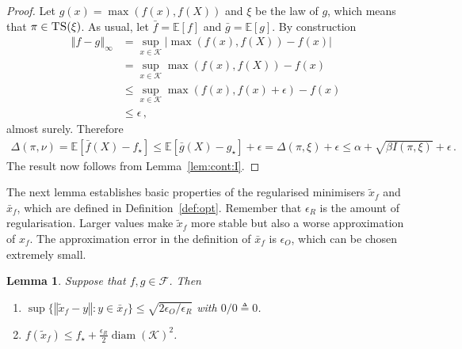 \documentclass[letter, 12pt]{report}
\newcommand{\epsR}{{\epsilon_R}}
\newcommand{\epsO}{{\epsilon_O}}
\newcommand{\norm}[1]{\left \Vert  #1 \right \Vert}
\newcommand{\E}{\mathbb E}
\newcommand{\cK}{\mathcal K}
\newcommand{\sF}{\mathscr F}
\newcommand{\diam}{\operatorname{diam}}
\newcommand{\1}{\mathbf{1}}
\newcommand{\ts}{\textsc{TS}\xspace}
\theoremstyle{plain}
\newtheorem{lemma}[theorem]{Lemma}
\theoremstyle{definition}
\theoremstyle{remark}
\begin{document}
\begin{proof}
    Let $g(x) = \max(f(x), f(X))$ and $\xi$ be the law of $g$, which means that $\pi \in \ts(\xi)$. %
    As usual, let $\bar f = \E[f]$ and $\bar g = \E[g]$.
    By construction
    \begin{align*}
        \norm{f - g}_\infty
         & =
        \sup_{x \in \cK} |\max(f(x), f(X)) - f(x)|          \\
         & =
        \sup_{x \in \cK} \max(f(x), f(X)) - f(x)            \\
         & \leq
        \sup_{x \in \cK} \max(f(x), f(x) + \epsilon) - f(x) \\
         & \leq \epsilon\,,
    \end{align*}
    almost surely.
    Therefore
    \begin{align*}
        \Delta(\pi, \nu)
        = \E[\bar f(X) - f_\star]
        \leq \E[\bar g(X) - g_\star] + \epsilon
        = \Delta(\pi, \xi) + \epsilon
        \leq \alpha + \sqrt{\beta I(\pi, \xi)} + \epsilon \,.
    \end{align*}
    The result now follows from Lemma~\ref{lem:cont:I}.
\end{proof}

The next lemma establishes basic properties of the regularised minimisers $\tilde x_f$ and $\bar x_f$, which are defined
in Definition~\ref{def:opt}.
Remember that $\epsR$ is the amount of regularisation. Larger values make $\tilde x_f$ more stable but also a worse approximation of $x_f$.
The approximation error in the definition of $\bar x_f$ is $\epsO$, which can be chosen extremely small.

\begin{lemma}\label{lem:sc}
    Suppose that $f, g \in \sF$.
    Then
    \begin{enumerate}
        \item $\sup \{\norm{\tilde x_f - y} : y \in \bar x_f\} \leq \sqrt{2\epsO / \epsR}$ with $0/0 \triangleq 0$. \label{lem:sc:approx-close}
        \item $f(\tilde x_f) \leq f_\star + \frac{\epsR}{2} \diam(\cK)^2$. \label{lem:sc:min}
    \end{enumerate}
\end{lemma}
\end{document}

